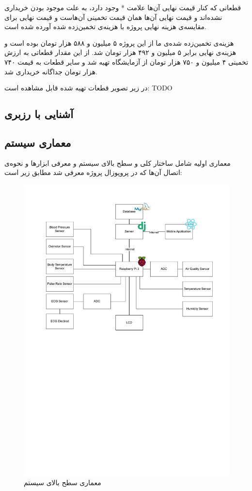 \documentclass[12pt]{article}
\begin{document}
قطعاتی که کنار قیمت نهایی آن‌ها علامت * وجود دارد، به علت موجود بودن خریداری نشده‌اند و قیمت نهایی آن‌ها همان قیمت تخمینی آن‌هاست و قیمت نهایی برای مقایسه‌ی هزینه نهایی پروژه با هزینه‌ی تخمین‌زده شده آورده شده‌ است.


هزینه‌ی تخمین‌زده شده‌ی ما از این پروژه ۵ میلیون و ۵۸۸ هزار تومان بوده است و هزینه‌ی نهایی برابر ۵ میلیون و ۴۹۲ هزار تومان شد. از این مقدار قطعاتی به ارزش تخمینی ۴ میلیون و ۷۵۰ هزار تومان از آزمایشگاه تهیه شد و سایر قطعات به قیمت ۷۴۰ هزار تومان جداگانه خریداری شد.

در زیر تصویر قطعات تهیه شده قابل مشاهده است:
TODO


\subsection{آشنایی با رزبری}
\subsection{معماری سیستم}
معماری اولیه شامل ساختار کلی و سطح بالای سیستم و معرفی ابزارها و نحوه‌ی اتصال آن‌ها که در پروپوزال پروژه معرفی شد مطابق زیر است:
\begin{figure}[h]
	\begin{center}
		\includegraphics[width=.85\textwidth,trim={0 14cm 0 1cm},clip]{initial_arch} %
	\end{center}
	\caption{معماری سطح بالای سیستم}
\end{figure}
\end{document}
